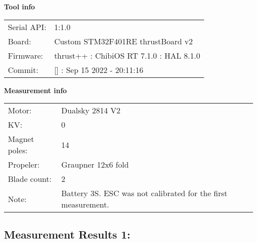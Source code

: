 \documentclass[10pt]{article}
\begin{document}
\noindent
{\large \bf Tool info}
\vspace{3mm}

\noindent
\begin{tabular}{ll}
Serial API:  & 1:1.0\\ 
Board:       & Custom STM32F401RE thrustBoard v2\\ 
Firmware:    & thrust++ : ChibiOS RT 7.1.0 : HAL 8.1.0\\ 
Commit:      & [] : Sep 15 2022 - 20:11:16
\end{tabular}
\vspace{3mm}

\noindent
{\large \bf Measurement info}
\vspace{3mm}

\noindent
\begin{tabular}{ll}
Motor:        & Dualsky 2814 V2\\ 
KV:           & 0\\ 
Magnet poles: & 14\\ 
Propeler:     & Graupner 12x6 fold\\ 
Blade count:  & 2\\ 
Note:         & Battery 3S. ESC was not calibrated for the first measurement.
\end{tabular}

\vspace{3mm}


\subsection*{\large \bf Measurement Results 1:}
\end{document}
